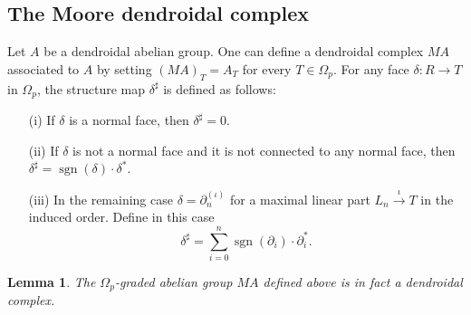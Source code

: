 \documentclass[a4paper]{amsart}
\theoremstyle{plain}
\newtheorem{lem}[thm]{Lemma}
\theoremstyle{definition}
\theoremstyle{remark}
\DeclareMathOperator{\sgn}{sgn}
\newcommand{\rpd}{\Omega_p}
\newcommand{\To}{\longrightarrow}
\numberwithin{equation}{section}
\numberwithin{figure}{section}
\begin{document}
\subsection{The Moore dendroidal complex}
Let $A$ be a dendroidal abelian group. One can define a dendroidal complex $MA$ associated to $A$ by
setting $(MA)_T=A_T$ for every $T\in \rpd$. For any face $\delta\colon R\To T$ in $\rpd$, the structure map $\delta^\sharp$ is defined as
follows:
\begin{itemize}
\item[{\rm (i)}] If $\delta$ is a normal face, then $\delta^\sharp=0$.
\item[{\rm (ii)}] If $\delta$ is not a normal face and it is not connected to any normal face, then $\delta^\sharp=\sgn{(\delta)}\cdot\delta^*$.
\item[{\rm (iii)}] In the remaining case $\delta=\partial^{(\iota)}_n$ for a maximal linear part
$L_n\stackrel{\iota}{\longrightarrow} T$ in the induced order. Define in this case
\[
\delta^\sharp=\sum_{i=0}^n\sgn(\partial_i)\cdot\partial_i^*.
\]
\end{itemize}
\begin{lem}
The $\rpd$-graded abelian group $MA$ defined above is in fact a dendroidal complex.
\end{lem}
\end{document}
